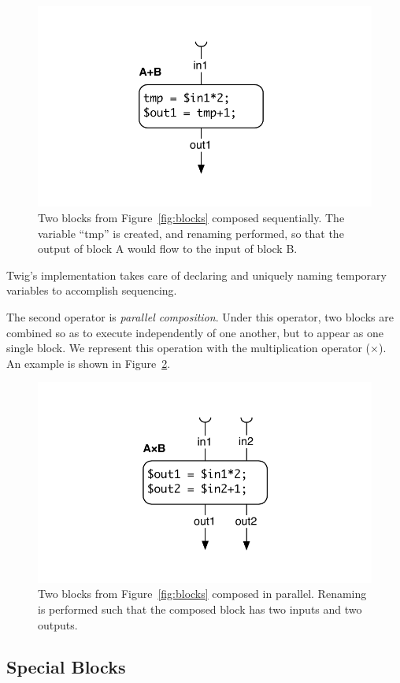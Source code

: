 \begin{figure}[ht]
\centering
\includegraphics[width=0.75\columnwidth]{images/code-gen2}
\caption{Two blocks from Figure~\ref{fig:blocks} composed sequentially. The variable ``tmp'' is created, and renaming performed, so that the output of block A would flow to the input of block B.}
\label{fig:codegen-seq}
\end{figure}

Twig's implementation takes care of declaring and uniquely naming temporary variables to accomplish sequencing.

The second operator is \emph{parallel composition}. Under this operator, two blocks are combined so as to execute independently of one another, but to appear as one single block. We represent this operation with the multiplication operator ($\times$). An example is shown in Figure~\ref{fig:codegen-par}.

\begin{figure}[ht]
\centering
\includegraphics[width=0.75\columnwidth]{images/code-gen3}
\caption{Two blocks from Figure~\ref{fig:blocks} composed in parallel. Renaming is performed such that the composed block has two inputs and two outputs.}
\label{fig:codegen-par}
\end{figure}

\subsection{Special Blocks}

